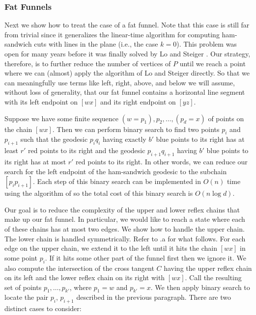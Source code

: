 \documentclass[charterfonts,lotsofwhite]{patmorin}
\newcommand{\chain}[2]{[#1#2]}
\begin{document}
\subsubsection{Fat Funnels}

Next we show how to treat the case of a fat funnel.  Note that this
case is still far from trivial since it generalizes the linear-time
algorithm for computing ham-sandwich cuts with lines in the plane
(i.e., the case $k=0$).  This problem was open for many years before
it was finally solved by Lo and Steiger \cite{ls90}.  Our strategy,
therefore, is to further reduce the number of vertices of $P$ until we
reach a point where we can (almost) apply the algorithm of Lo and
Steiger directly.  So that we can meaningfully use terms like left,
right, above, and below we will assume, without loss of generality,
that our fat funnel contains a horizontal line segment with its left
endpoint on $\chain{w}{x}$ and its right endpoint on $\chain{y}{z}$.

Suppose we have some finite sequence $(w=p_1),p_2,\ldots,(p_d=x)$ of
points on the chain $\chain{w}{x}$. Then we can perform binary search
to find two points $p_i$ and $p_{i+1}$ such that the geodesic $p_iq_i$
having exactly $b'$ blue points to its right has at least $r'$ red
points to its right and the geodesic $p_{i+1}q_{i+1}$ having $b'$ blue
points to its right has at most $r'$ red points to its right.  In
other words, we can reduce our search for the left endpoint of the
ham-sandwich geodesic to the subchain $\chain{p_i}{p_{i+1}}$.  Each
step of this binary search can be implemented in $O(n)$ time using the
algorithm of  so the total cost of this binary
search is $O(n\log d)$.

Our goal is to reduce the complexity of the upper and lower reflex
chains that make up our fat funnel.  In particular, we would like to
reach a state where each of these chains has at most two edges.  We
show how to handle the upper chain.  The lower chain is handled
symmetrically. Refer to .a for what follows.  For
each edge on the upper chain, we extend it to the left until it hits
the chain $\chain{w}{x}$ in some point $p_i$.  If it hits some other
part of the funnel first then we ignore it.  We also compute the
intersection of the cross tangent $C$ having the upper reflex chain on
its left and the lower reflex chain on its right with $\chain{w}{x}$.
Call the resulting set of points $p_1,\ldots,p_{k'}$, where $p_1=w$
and $p_{k'}=x$.  We then apply binary search to locate the pair $p_i$,
$p_{i+1}$ described in the previous paragraph.  There are two distinct
cases to consider:
\end{document}
